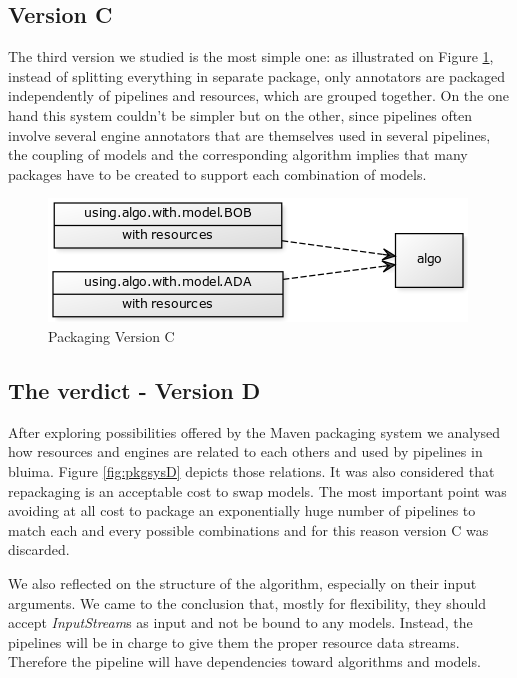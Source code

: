 \documentclass{article}
\newcommand{\id}[1]{\mbox{\textit{#1}}}
\begin{document}
\subsection{Version C}

The third version we studied is the most simple one: as illustrated on Figure \ref{fig:pkgsysC}, instead of splitting everything in separate package, only annotators are packaged independently of pipelines and resources, which are grouped together. On the one hand this system couldn't be simpler but on the other, since pipelines often involve several engine annotators that are themselves used in several pipelines, the coupling of models and the corresponding algorithm implies that many packages have to be created to support each combination of models.


\begin{figure}
\centering
\includegraphics{res/packaging_version_C.png}
\caption{Packaging Version C}
\label{fig:pkgsysC}
\end{figure}


\subsection{The verdict - Version D}

After exploring possibilities offered by the Maven packaging system we analysed how resources and engines are related to each others and used by pipelines in bluima. Figure \ref{fig:pkgsysD} depicts those relations. It was also considered that repackaging is an acceptable cost to swap models. The most important point was avoiding at all cost to package an exponentially huge number of pipelines to match each and every possible combinations and for this reason version C was discarded.

We also reflected on the structure of the algorithm, especially on their input arguments. We came to the conclusion that, mostly for flexibility, they should accept \id{InputStream}s as input and not be bound to any models. Instead, the pipelines will be in charge to give them the proper resource data streams. Therefore the pipeline will have dependencies toward algorithms and models.
\end{document}
